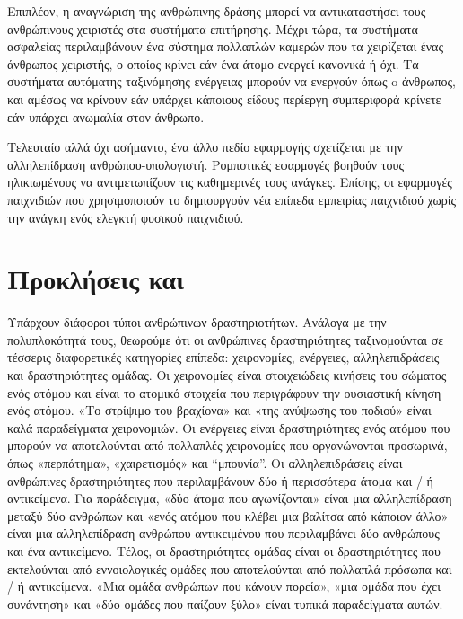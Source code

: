 Επιπλέον, η αναγνώριση της ανθρώπινης δράσης μπορεί να αντικαταστήσει τους ανθρώπινους χειριστές στα συστήματα επιτήρησης. Μέχρι τώρα,
τα συστήματα ασφαλείας περιλαμβάνουν ένα σύστημα πολλαπλών καμερών που τα χειρίζεται ένας άνθρωπος χειριστής, ο οποίος κρίνει εάν ένα άτομο
ενεργεί κανονικά ή όχι. Τα συστήματα αυτόματης ταξινόμησης ενέργειας μπορούν να ενεργούν όπως o άνθρωπος, και αμέσως να κρίνουν
εάν υπάρχει κάποιους είδους περίεργη συμπεριφορά
κρίνετε εάν υπάρχει ανωμαλία στον άνθρωπο.

Τελευταίο αλλά όχι ασήμαντο, ένα άλλο πεδίο εφαρμογής σχετίζεται με την αλληλεπίδραση ανθρώπου-υπολογιστή. Ρομποτικές εφαρμογές
βοηθούν τους ηλικιωμένους να αντιμετωπίζουν τις καθημερινές τους ανάγκες. Επίσης, οι εφαρμογές παιχνιδιών που χρησιμοποιούν το  δημιουργούν νέα επίπεδα
εμπειρίας παιχνιδιού χωρίς την ανάγκη ενός ελεγκτή φυσικού παιχνιδιού.


\section{Προκλήσεις και }

Υπάρχουν διάφοροι τύποι ανθρώπινων δραστηριοτήτων. Ανάλογα με την πολυπλοκότητά τους, θεωρούμε ότι οι ανθρώπινες δραστηριότητες ταξινομούνται σε τέσσερις διαφορετικές κατηγορίες
επίπεδα: χειρονομίες, ενέργειες, αλληλεπιδράσεις και δραστηριότητες ομάδας. Οι χειρονομίες είναι στοιχειώδεις κινήσεις του σώματος ενός ατόμου και είναι το ατομικό
στοιχεία που περιγράφουν την ουσιαστική κίνηση ενός ατόμου. «Το στρίψιμο του βραχίονα» και «της ανύψωσης του ποδιού» είναι καλά παραδείγματα χειρονομιών.
Οι ενέργειες είναι δραστηριότητες ενός ατόμου που μπορούν να αποτελούνται από πολλαπλές χειρονομίες που οργανώνονται προσωρινά, όπως «περπάτημα», «χαιρετισμός» και
``μπουνία''. Οι αλληλεπιδράσεις είναι ανθρώπινες δραστηριότητες που περιλαμβάνουν δύο ή περισσότερα άτομα και / ή αντικείμενα. Για παράδειγμα, «δύο άτομα που αγωνίζονται» είναι 
μια αλληλεπίδραση μεταξύ δύο ανθρώπων και  «ενός ατόμου που κλέβει μια βαλίτσα από κάποιον άλλο» είναι μια αλληλεπίδραση ανθρώπου-αντικειμένου που περιλαμβάνει δύο ανθρώπους και ένα
αντικείμενο. Τέλος, οι δραστηριότητες ομάδας είναι οι δραστηριότητες που εκτελούνται από εννοιολογικές ομάδες που αποτελούνται από πολλαπλά πρόσωπα και / ή αντικείμενα. «Μια ομάδα ανθρώπων
που κάνουν πορεία», «μια ομάδα που έχει συνάντηση» και «δύο ομάδες που παίζουν ξύλο» είναι τυπικά παραδείγματα αυτών.

